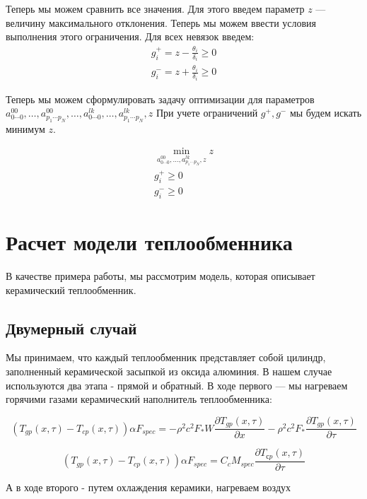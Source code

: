 \documentclass[a4paper,12pt]{article}
\begin{document}
  Теперь мы можем сравнить все значения. Для этого введем параметр $z$ ---
  величину максимального отклонения. Теперь мы можем ввести условия выполнения этого ограничения.
  Для всех невязок введем:
  \begin{eqnarray}
    g^{+}_i = z - \frac{\theta_i}{\delta_i} \ge 0\\
    g^{-}_i = z + \frac{\theta_i}{\delta_i} \ge 0
  \end{eqnarray}

  Теперь мы можем сформулировать задачу оптимизации для параметров
  $a^{00}_{0 \cdots 0},\ldots,a^{00}_{p_1 \cdots p_N},\ldots,a^{lk}_{0 \cdots 0},\ldots,a^{lk}_{p_1 \cdots p_N},z$
  При учете ограничений $g^{+},g^{-}$ мы будем искать минимум $z$.

  \begin{eqnarray*}
    \min_{a^{00}_{0 \cdots 0},\ldots,a^{lk}_{p_1 \cdots p_N},z} z \\
    g^{+}_i \ge 0 \\
    g^{-}_i \ge 0
  \end{eqnarray*}
  
  \section{Расчет модели теплообменника}

  В качестве примера работы, мы рассмотрим модель, которая описывает
  керамический теплообменник.

  \subsection{Двумерный случай}

  Мы принимаем, что каждый теплообменник представляет собой цилиндр,
  заполненный керамической засыпкой из оксида алюминия. В нашем случае
  используются два этапа - прямой и обратный. В ходе первого — мы
  нагреваем горячими газами керамический наполнитель теплообменника:

  $$(T_{gp}(x,\tau) - T_{cp}(x,\tau)) \alpha F_{spec} = - \rho^2 c^2 F_* W\frac{\partial T_{gp}(x,\tau)}{\partial x} - \rho^2 c^2 F_*\frac{\partial T_{gp}(x,\tau)}{\partial \tau}$$

  $$(T_{gp}(x,\tau) - T_{cp}(x,\tau))\alpha F_{spec}=  C_c M_{spec} \frac{\partial T_{сp}(x,\tau)}{\partial \tau}$$

  А в ходе второго - путем охлаждения керамики, нагреваем воздух
\end{document}
